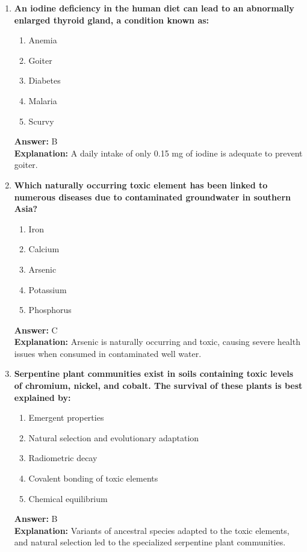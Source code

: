 \documentclass[11pt, a4paper]{article}
\begin{document}
\begin{enumerate}
\item \textbf{An iodine deficiency in the human diet can lead to an abnormally enlarged thyroid gland, a condition known as:}
\begin{enumerate}[label=\Alph*.]
    \item Anemia
    \item Goiter
    \item Diabetes
    \item Malaria
    \item Scurvy
\end{enumerate}
\textbf{Answer:} B \\
\textbf{Explanation:} A daily intake of only 0.15 mg of iodine is adequate to prevent goiter.

\item \textbf{Which naturally occurring toxic element has been linked to numerous diseases due to contaminated groundwater in southern Asia?}
\begin{enumerate}[label=\Alph*.]
    \item Iron
    \item Calcium
    \item Arsenic
    \item Potassium
    \item Phosphorus
\end{enumerate}
\textbf{Answer:} C \\
\textbf{Explanation:} Arsenic is naturally occurring and toxic, causing severe health issues when consumed in contaminated well water.

\item \textbf{Serpentine plant communities exist in soils containing toxic levels of chromium, nickel, and cobalt. The survival of these plants is best explained by:}
\begin{enumerate}[label=\Alph*.]
    \item Emergent properties
    \item Natural selection and evolutionary adaptation
    \item Radiometric decay
    \item Covalent bonding of toxic elements
    \item Chemical equilibrium
\end{enumerate}
\textbf{Answer:} B \\
\textbf{Explanation:} Variants of ancestral species adapted to the toxic elements, and natural selection led to the specialized serpentine plant communities.


\end{enumerate}
\end{document}
